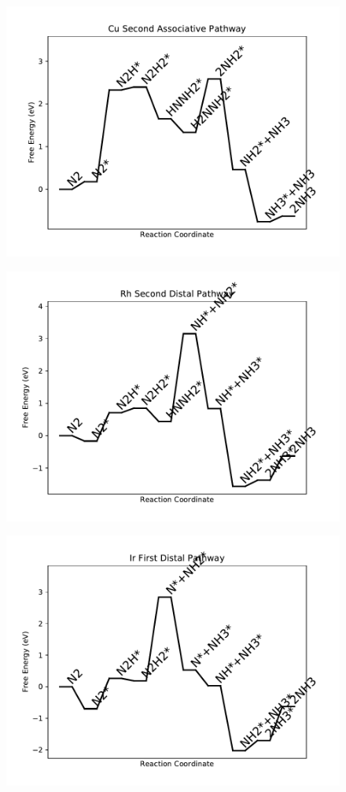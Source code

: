 \begin{figure}
\includegraphics[width=0.8\linewidth]{data/plots/Cu_associative_2.pdf}
\end{figure}

\begin{figure}
\includegraphics[width=0.8\linewidth]{data/plots/Rh_distal_2.pdf}
\end{figure}

\begin{figure}
\includegraphics[width=0.8\linewidth]{data/plots/Ir_distal_1.pdf}
\end{figure}

